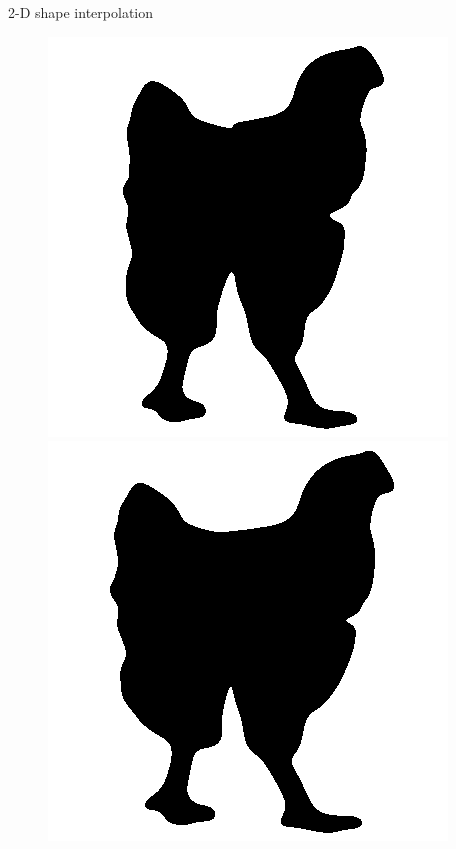 \begin{frame}{2-D shape interpolation}
\begin{figure}
\begin{minipage}[t]{0.08\linewidth}
        \end{minipage}
        \hfill
        \begin{minipage}[t]{0.08\linewidth}
            \vspace{0pt}
            \centering
            \includegraphics[width=\textwidth]{png/kun-chicken/shape-1-7.png}
        \end{minipage}
        \hfill
        \begin{minipage}[t]{0.08\linewidth}
            \vspace{0pt}
            \centering
            \includegraphics[width=\textwidth]{png/kun-chicken/shape-1-8.png}

\end{minipage}
\end{figure}
\end{frame}
